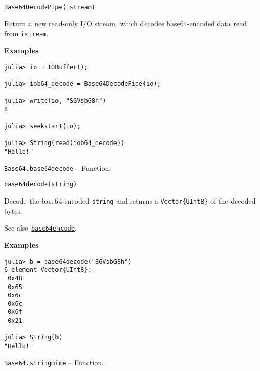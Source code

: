 \begin{adjustwidth}{2em}{0pt}


\begin{verbatim}
Base64DecodePipe(istream)
\end{verbatim}

Return a new read-only I/O stream, which decodes base64-encoded data read from \texttt{istream}.

\textbf{Examples}


\begin{verbatim}
julia> io = IOBuffer();

julia> iob64_decode = Base64DecodePipe(io);

julia> write(io, "SGVsbG8h")
8

julia> seekstart(io);

julia> String(read(iob64_decode))
"Hello!"
\end{verbatim}



\end{adjustwidth}
\hypertarget{7809304046524048078}{}
\hyperlink{7809304046524048078}{\texttt{Base64.base64decode}}  -- {Function.}

\begin{adjustwidth}{2em}{0pt}


\begin{verbatim}
base64decode(string)
\end{verbatim}

Decode the base64-encoded \texttt{string} and returns a \texttt{Vector\{UInt8\}} of the decoded bytes.

See also \hyperlink{1446212874874362397}{\texttt{base64encode}}.

\textbf{Examples}


\begin{verbatim}
julia> b = base64decode("SGVsbG8h")
6-element Vector{UInt8}:
 0x48
 0x65
 0x6c
 0x6c
 0x6f
 0x21

julia> String(b)
"Hello!"
\end{verbatim}



\end{adjustwidth}
\hypertarget{17279723834582920486}{}
\hyperlink{17279723834582920486}{\texttt{Base64.stringmime}}  -- {Function.}

